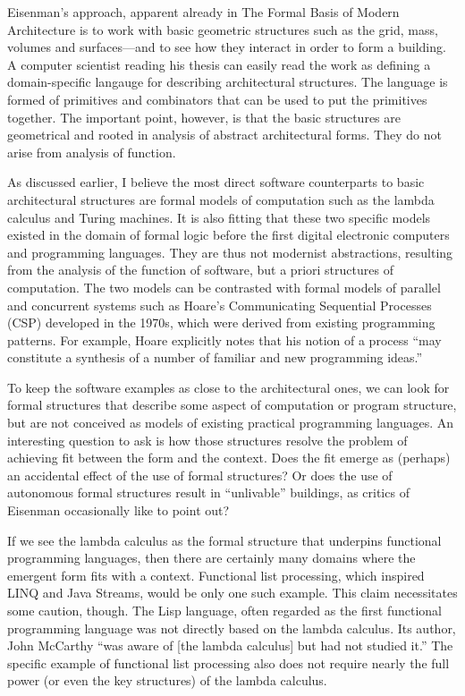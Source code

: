Eisenman's approach, apparent already in The Formal Basis of Modern Architecture is to work
with basic geometric structures such as the grid, mass, volumes and surfaces---and to see how
they interact in order to form a building. A computer scientist reading his thesis can easily
read the work as defining a domain-specific langauge for describing architectural structures.
The language is formed of primitives and combinators that can be used to put the primitives
together. The important point, however, is that the basic structures are geometrical and rooted
in analysis of abstract architectural forms. They do not arise from analysis of function.

As discussed earlier, I believe the most direct software counterparts to basic architectural
structures are formal models of computation such as the lambda calculus and Turing machines.
It is also fitting that these two specific models existed in the domain of formal logic before
the first digital electronic computers and programming languages. They are thus not modernist
abstractions, resulting from the analysis of the function of software, but a priori structures
of computation. The two models can be contrasted with formal models of parallel and concurrent
systems such as Hoare's Communicating Sequential Processes (CSP) developed in the
1970s,
which were derived from existing programming patterns. For example, Hoare explicitly notes
that his notion of a process ``may constitute a synthesis of a number of familiar and new
programming ideas.''

To keep the software examples as close to the architectural ones, we can look for formal
structures that describe some aspect of computation or program structure, but are not conceived
as models of existing practical programming languages. An interesting question to ask is how
those structures resolve the problem of achieving fit between the form and the context. Does the
fit emerge as (perhaps) an accidental effect of the use of formal structures? Or does the use
of autonomous formal structures result in ``unlivable'' buildings, as critics of Eisenman
occasionally like to point out?

If we see the lambda calculus as the formal structure that underpins functional programming
languages, then there are certainly many domains where the emergent form fits with a context.
Functional list processing, which inspired LINQ and Java Streams, would be only one such example.
This claim necessitates some caution, though. The Lisp language, often regarded
as the first functional programming language was not directly based on the lambda calculus.
Its author, John McCarthy ``was aware of [the lambda calculus] but had not studied
it.'' The specific
example of functional list processing also does not require nearly the full power (or even the
key structures) of the lambda calculus.

